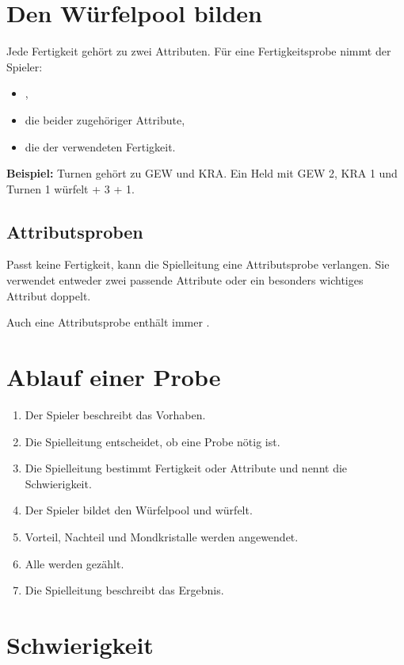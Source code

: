 \section{Den Würfelpool bilden}

Jede Fertigkeit gehört zu zwei Attributen. Für eine Fertigkeitsprobe nimmt der Spieler:

\begin{itemize}
  \item \heroDie,
  \item die \greenDie{} beider zugehöriger Attribute,
  \item die \blueDie{} der verwendeten Fertigkeit.
\end{itemize}

\textbf{Beispiel:} Turnen gehört zu GEW und KRA. Ein Held mit GEW 2, KRA 1 und Turnen 1 würfelt \heroDie{} + 3\greenDie{} + 1\blueDie.

\subsection{Attributsproben}

Passt keine Fertigkeit, kann die Spielleitung eine Attributsprobe verlangen. Sie verwendet entweder zwei passende Attribute oder ein besonders wichtiges Attribut doppelt.

Auch eine Attributsprobe enthält immer \heroDie.

\section{Ablauf einer Probe}

\begin{enumerate}
  \item Der Spieler beschreibt das Vorhaben.
  \item Die Spielleitung entscheidet, ob eine Probe nötig ist.
  \item Die Spielleitung bestimmt Fertigkeit oder Attribute und nennt die Schwierigkeit.
  \item Der Spieler bildet den Würfelpool und würfelt.
  \item Vorteil, Nachteil und Mondkristalle werden angewendet.
  \item Alle \star{} werden gezählt.
  \item Die Spielleitung beschreibt das Ergebnis.
\end{enumerate}

\section{Schwierigkeit}

